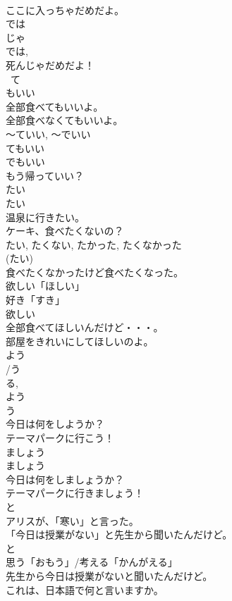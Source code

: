 \documentclass[8pt]{extreport}
\begin{document}
\begin{CJK}{UTF8}{min}
\\	ここに入っちゃだめだよ。
\\	では 
\\	じゃ	
\\	では, 
\\	死んじゃだめだよ！
\\	~て 
\\	もいい	
\\	全部食べてもいいよ。
\\	全部食べなくてもいいよ。
\\	～ていい, ～でいい	
\\	てもいい 
\\	でもいい 
\\	もう帰っていい？ 
\\	たい	
\\	たい 
\\	温泉に行きたい。
\\	ケーキ、食べたくないの？ 
\\	たい, たくない, たかった, たくなかった	
\\	(たい) 
\\	食べたくなかったけど食べたくなった。	
\\	欲しい「ほしい」	
\\	好き「すき」
\\	欲しい　
\\	全部食べてほしいんだけど・・・。 
\\	部屋をきれいにしてほしいのよ。 
\\	よう 
\\	/う 
\\	る, 
\\	よう
\\	う 
\\	今日は何をしようか？ 
\\	テーマパークに行こう！
\\	ましょう	
\\	ましょう 
\\	今日は何をしましょうか？
\\	テーマパークに行きましょう！ 
\\	と 
\\	アリスが、「寒い」と言った。
\\	「今⽇は授業がない」と先⽣から聞いたんだけど。
\\	と 
\\	思う「おもう」/考える「かんがえる」	
\\	先生から今日は授業がないと聞いたんだけど。
\\	これは、日本語で何と言いますか。

\end{CJK}
\end{document}
